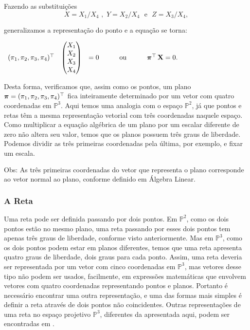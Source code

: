 Fazendo as substituições 
\begin{equation*}
X=X_1/X_4 \,\, , \,\, Y=X_2/X_4 \,\,\,\, \text{e} \,\,\,\, Z=X_3/X_4 ,
\end{equation*}

generalizamos a representação do ponto e a equação se torna:

\begin{center}
$
\begin{array}{ccccc}
(\pi_1,\pi_2,\pi_3,\pi_4)^\top
& \begin{pmatrix}
  X_1\\
  X_2\\
  X_3\\
  X_4
  \end{pmatrix}
& = 0
& \qquad \text{ou} \qquad
& \boldsymbol{\pi}^\top \, \mathbf{X} = 0.
\end{array}
$
\end{center}


Desta forma, verificamos que, assim como os pontos, um plano $\boldsymbol{\pi} = (\pi_1,\pi_2,\pi_3,\pi_4)^\top$ fica inteiramente determinado por um vetor com quatro coordenadas em $\mathbb{P}^3$. Aqui temos uma analogia com o espaço $\mathbb{P}^2$, já que pontos e retas têm a mesma representação vetorial com três coordenadas naquele espaço. Como multiplicar a equação algébrica de um plano por um escalar diferente de zero não altera seu valor, temos que os planos possuem três graus de liberdade. Podemos dividir as três primeiras coordenadas pela última, por exemplo, e fixar um escala.

Obs: As três primeiras coordenadas do vetor que representa o plano corresponde ao vetor normal ao plano, conforme definido em Álgebra Linear.
\\


\subsubsection{A Reta}

Uma reta pode ser definida passando por dois pontos. Em $\mathbb{P}^2$, como os dois pontos estão no mesmo plano, uma reta passando por esses dois pontos tem apenas três graus de liberdade, conforme visto anteriormente. Mas em $\mathbb{P}^3$, como os dois pontos podem estar em planos diferentes, temos que uma reta apresenta quatro graus de liberdade, dois graus para cada ponto. Assim, uma reta deveria ser representada por um vetor com cinco coordenadas em $\mathbb{P}^3$, mas vetores desse tipo não podem ser usados, facilmente, em expressões matemáticas que envolvem vetores com quatro coordenadas representando pontos e planos. Portanto é necessário encontrar uma outra representação, e uma das formas mais simples é definir a reta através de dois pontos não coincidentes. Outras representações de uma reta no espaço projetivo $\mathbb{P}^3$, diferentes da apresentada aqui, podem ser encontradas em \cite{Hartley2004}.


